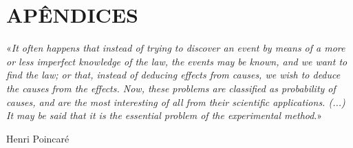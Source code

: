 \documentclass[a4paper, 12pt]{article}
\numberwithin{equation}{section}
\begin{document}
\pagestyle{empty}
\hypersetup{pageanchor=false}


\newpage
\pagestyle{plain}
\hypersetup{pageanchor=true}
\setcounter{page}{1}
\justify
  

\newpage
\clearpage
{}
{}
{\singlespacing
 \renewcommand{\refname}{REFERÊNCIAS BIBLIOGRÁFICAS}
\renewcommand*{\bibfont}{\normalfont\small}
 \printbibliography
}

\newpage
\part*{APÊNDICES}\label{partfinal}
{}
\vspace{1cm}
\epigraph{«\textit{It often happens that instead of trying to discover an event by means of a more or less imperfect knowledge of the law, the events may be known, and we want to find the law; or that, instead of deducing effects from causes, we wish to deduce the causes from the effects. Now, these problems are classified as probability of causes, and are the most interesting of all from their scientific applications. (...) It may be said that it is the essential problem of the experimental method}.»}{Henri Poincaré \cite{poincare1917, poincare2018science}}

\newpage
{}
\begin{appendices}
\normalsize
 
\end{appendices}
   
\end{document}
